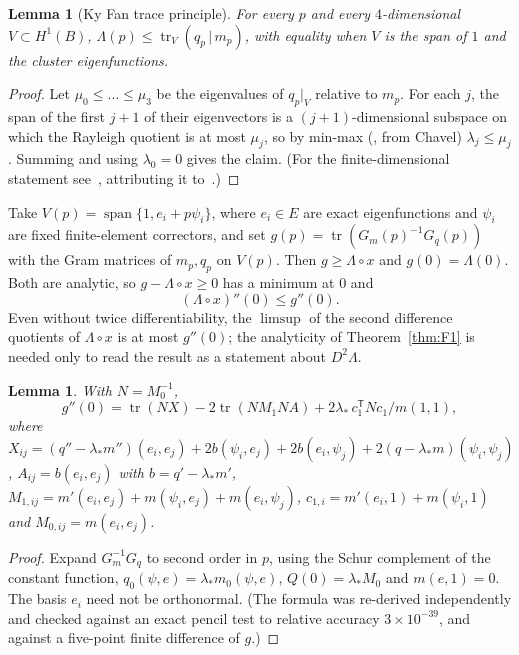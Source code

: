 \documentclass[11pt]{amsart}
\newtheorem{lemma}[theorem]{Lemma}
\theoremstyle{definition}
\theoremstyle{remark}
\newcommand{\tr}{\operatorname{tr}}
\newcommand{\ls}{\lambda_*}
\begin{document}
\begin{lemma}[Ky Fan trace principle]\label{lem:KyFan}
For every $p$ and every $4$-dimensional $V\subset H^1(B)$,
$\Lambda(p)\le\tr_V(q_p\,|\,m_p)$, with equality when $V$ is the span of $1$ and the cluster
eigenfunctions.
\end{lemma}

\begin{proof}
Let $\mu_0\le\dots\le\mu_3$ be the eigenvalues of $q_p|_V$ relative to $m_p$. For each $j$, the span of
the first $j+1$ of their eigenvectors is a $(j+1)$-dimensional subspace on which the Rayleigh
quotient is at most $\mu_j$, so by min-max (\cite[Thm.~1.22]{Coo18}, from Chavel)
$\lambda_j\le\mu_j$. Summing and using $\lambda_0=0$ gives the claim. (For the finite-dimensional
statement see~\cite{Mos}, attributing it to~\cite{Fan49,Fan50}.)
\end{proof}

Take $V(p)=\operatorname{span}\{1,e_i+p\psi_i\}$, where $e_i\in E$ are exact eigenfunctions and
$\psi_i$ are fixed finite-element correctors, and set $g(p)=\tr(G_m(p)^{-1}G_q(p))$ with the Gram
matrices of $m_p,q_p$ on $V(p)$. Then $g\ge\Lambda\circ x$ and $g(0)=\Lambda(0)$. Both are analytic, so
$g-\Lambda\circ x\ge0$ has a minimum at $0$ and
\begin{equation}\label{eq:kyfan}
(\Lambda\circ x)''(0)\le g''(0).
\end{equation}
Even without twice differentiability, the $\limsup$ of the second difference quotients of
$\Lambda\circ x$ is at most $g''(0)$; the analyticity of Theorem~\ref{thm:F1} is needed only to read the
result as a statement about $D^2\Lambda$.

\begin{lemma}\label{lem:g2formula}
With $N=M_0^{-1}$,
\[
g''(0)=\tr(NX)-2\tr(NM_1NA)+2\ls\,c_1^{\mathsf T}Nc_1/m(1,1),
\]
where $X_{ij}=(q''-\ls m'')(e_i,e_j)+2b(\psi_i,e_j)+2b(e_i,\psi_j)+2(q-\ls m)(\psi_i,\psi_j)$,
$A_{ij}=b(e_i,e_j)$ with $b=q'-\ls m'$, $M_{1,ij}=m'(e_i,e_j)+m(\psi_i,e_j)+m(e_i,\psi_j)$,
$c_{1,i}=m'(e_i,1)+m(\psi_i,1)$ and $M_{0,ij}=m(e_i,e_j)$.
\end{lemma}

\begin{proof}
Expand $G_m^{-1}G_q$ to second order in $p$, using the Schur complement of the constant function,
$q_0(\psi,e)=\ls m_0(\psi,e)$, $Q(0)=\ls M_0$ and $m(e,1)=0$. The basis $e_i$ need not be orthonormal.
(The formula was re-derived independently and checked against an exact pencil test to relative
accuracy $3\times10^{-39}$, and against a five-point finite difference of $g$.)
\end{proof}
\end{document}

